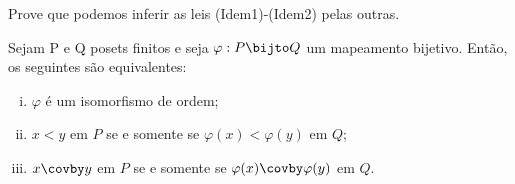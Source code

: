 \begin{exercise}
	Prove que podemos inferir as leis (Idem1)-(Idem2) pelas outras.
\end{exercise}

\begin{exercise}
	Sejam P e Q posets finitos e seja ${\varphi}:P \bijto Q$ um mapeamento bijetivo. Então, os seguintes são equivalentes:
	\begin{enumerate}[(i)]
		\item $\varphi$ é um isomorfismo de ordem;
		\item $x < y$ em $P$ se e somente se $\varphi(x) < \varphi(y)$ em $Q$;
		\item $x \covby y$ em $P$ se e somente se $\varphi(x) \covby \varphi(y)$ em $Q$.
	\end{enumerate}
\end{exercise}

